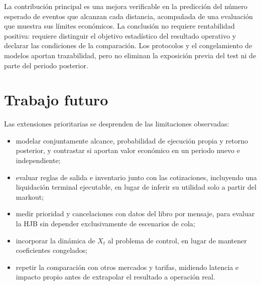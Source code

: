 La contribución principal es una mejora verificable en la predicción del número esperado de eventos que alcanzan cada distancia, acompañada de una evaluación que muestra sus límites económicos. La conclusión no requiere rentabilidad positiva: requiere distinguir el objetivo estadístico del resultado operativo y declarar las condiciones de la comparación. Los protocolos y el congelamiento de modelos aportan trazabilidad, pero no eliminan la exposición previa del test ni de parte del periodo posterior.

\section*{Trabajo futuro}

Las extensiones prioritarias se desprenden de las limitaciones observadas:
\begin{itemize}[nosep]
\item modelar conjuntamente alcance, probabilidad de ejecución propia y retorno posterior, y contrastar si aportan valor económico en un periodo nuevo e independiente;
\item evaluar reglas de salida e inventario junto con las cotizaciones, incluyendo una liquidación terminal ejecutable, en lugar de inferir su utilidad solo a partir del markout;
\item medir prioridad y cancelaciones con datos del libro por mensaje, para evaluar la HJB sin depender exclusivamente de escenarios de cola;
\item incorporar la dinámica de $X_t$ al problema de control, en lugar de mantener coeficientes congelados;
\item repetir la comparación con otros mercados y tarifas, midiendo latencia e impacto propio antes de extrapolar el resultado a operación real.
\end{itemize}
